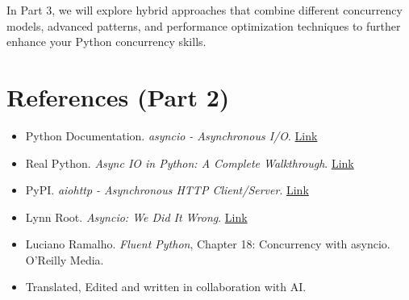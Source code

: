 \documentclass[12pt,letterpaper]{article}
\begin{document}
In Part 3, we will explore hybrid approaches that combine different concurrency models, advanced patterns, and performance optimization techniques to further enhance your Python concurrency skills.

\section{References (Part 2)}
\begin{itemize}
    \item Python Documentation. \textit{asyncio - Asynchronous I/O}. \href{https://docs.python.org/3/library/asyncio.html}{Link}
    
    \item Real Python. \textit{Async IO in Python: A Complete Walkthrough}. \href{https://realpython.com/async-io-python/}{Link}
    
    \item PyPI. \textit{aiohttp - Asynchronous HTTP Client/Server}. \href{https://pypi.org/project/aiohttp/}{Link}
    
    \item Lynn Root. \textit{Asyncio: We Did It Wrong}. \href{https://www.roguelynn.com/words/asyncio-we-did-it-wrong/}{Link}

    \item Luciano Ramalho. \textit{Fluent Python}, Chapter 18: Concurrency with asyncio. O'Reilly Media.
    
    \item Translated, Edited and written in collaboration with AI.
\end{itemize}
\end{document}
